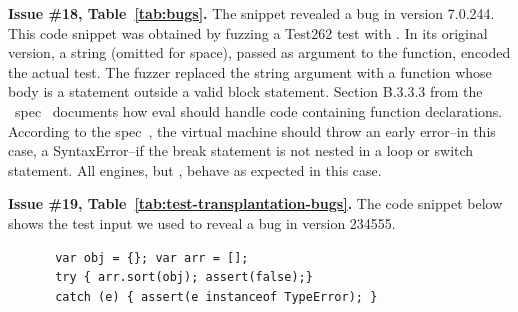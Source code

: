 \documentclass[smallextended]{svjour3}
\begin{document}
\vspace{1ex}\noindent\textbf{Issue \#18, Table~\ref{tab:bugs}.} The
snippet {\footnotesize{}}
revealed a bug in \textbf{\veight{}} version 7.0.244. This code snippet was
obtained by fuzzing a Test262 test with \quickfuzz. In its original
version, a string (omitted for space), passed as argument to the
 function, encoded the actual test. The fuzzer replaced
the string argument with a function whose body is a 
statement outside a valid block statement. Section B.3.3.3 from the
\es\ spec~\cite{spec-b333} documents how eval should handle code
containing function declarations.  According to the
spec~\cite{break-statement}, the virtual machine should throw an early
error--in this case, a SyntaxError--if the break statement is not
nested in a loop or switch statement. All engines, but \veight{},
behave as expected in this case.


\vspace{1ex}\noindent\textbf{Issue \#19,
  Table~\ref{tab:test-transplantation-bugs}.} The code snippet below
shows the test input we used to reveal a bug in \textbf{\jsc} version 234555.

\begin{figure}[h!]
  \vspace{-0.5ex}
  \centering
  \scriptsize
  \begin{lstlisting}
 var obj = {}; var arr = [];
 try { arr.sort(obj); assert(false);}
 catch (e) { assert(e instanceof TypeError); }
  \end{lstlisting}
  \normalsize
  \vspace{-1ex}
\end{figure}
\end{document}
